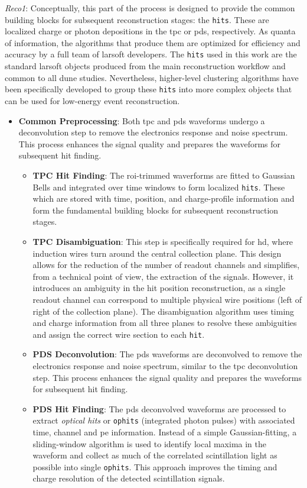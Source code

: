 \emph{Reco1}: Conceptually, this part of the process is designed to provide the common building blocks for subsequent reconstruction stages: the \texttt{hits}. These are localized charge or photon depositions in the \gls{tpc} or \gls{pds}, respectively. As quanta of information, the algorithms that produce them are optimized for efficiency and accuracy by a full team of \gls{larsoft} developers. The \texttt{hits} used in this work are the standard \gls{larsoft} objects produced from the main reconstruction workflow and common to all \gls{dune} studies. Nevertheless, higher-level clustering algorithms have been specifically developed to group these \texttt{hits} into more complex objects that can be used for low-energy event reconstruction.

\iffalse
\begin{itemize}    
    \item \textbf{Common Preprocessing}: Both \gls{tpc} and \gls{pds} waveforms undergo a deconvolution step to remove the electronics response and noise spectrum. This process enhances the signal quality and prepares the waveforms for subsequent hit finding.
    
    \begin{itemize}
        \item \textbf{TPC Hit Finding}: 
        The \gls{roi}-trimmed waverforms are fitted to Gaussian Bells and integrated over time windows to form localized \texttt{hits}. These which are stored with time, position, and charge-profile information and form the fundamental building blocks for subsequent reconstruction stages.
        \item \textbf{TPC Disambiguation}: This step is specifically required for \gls{hd}, where induction wires turn around the central collection plane. This design allows for the reduction of the number of readout channels and simplifies, from a technical point of view, the extraction of the signals. However, it introduces an ambiguity in the hit position reconstruction, as a single readout channel can correspond to multiple physical wire positions (left of right of the collection plane). The disambiguation algorithm uses timing and charge information from all three planes to resolve these ambiguities and assign the correct wire section to each \texttt{hit}.
        \item \textbf{PDS Deconvolution}: The \gls{pds} waveforms are deconvolved to remove the electronics response and noise spectrum, similar to the \gls{tpc} deconvolution step. This process enhances the signal quality and prepares the waveforms for subsequent hit finding.
        \item \textbf{PDS Hit Finding}: The \gls{pds} deconvolved waveforms are processed to extract \emph{optical hits} or \texttt{ophits} (integrated photon pulses) with associated time, channel and \gls{pe} information. Instead of a simple Gaussian-fitting, a sliding-window algorithm is used to identify local maxima in the waveform and collect as much of the correlated scintillation light as possible into single \texttt{ophits}. This approach improves the timing and charge resolution of the detected scintillation signals.
    \end{itemize}
    

\end{itemize}
